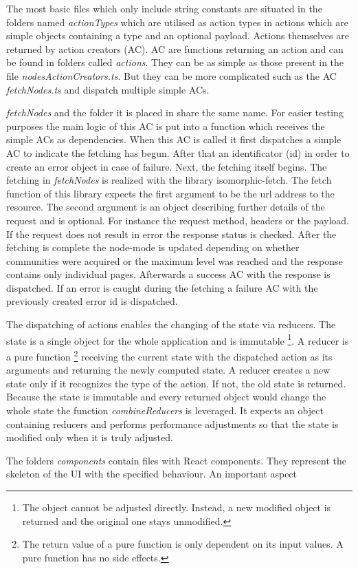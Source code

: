 The most basic files which only include string constants are situated in the folders named \textit{actionTypes} which are utilised as action types in actions which are simple objects containing a type and an optional payload. Actions themselves are returned by action creators (AC). AC are functions returning an action and can be found in folders called \textit{actions}. They can be as simple as those present in the file \textit{nodesActionCreators.ts}. But they can be more complicated such as the AC \textit{fetchNodes.ts} and dispatch multiple simple ACs. 

\textit{fetchNodes} and the folder it is placed in share the same name. For easier testing purposes the main logic of this AC is put into a function which receives the simple ACs as dependencies. When this AC is called it first dispatches a simple AC to indicate the fetching has begun. After that an identificator (id) in order to create an error object in case of failure. Next, the fetching itself begins. The fetching in \textit{fetchNodes} is realized with the library isomorphic-fetch. The fetch function of this library expects the first argument to be the url address to the resource. The second argument is an object describing further details of the request and is optional. For instance the request method, headers or the payload. If the request does not result in error the response status is checked. After the fetching is complete the node-mode is updated depending on whether communities were acquired or the maximum level was reached and the response contains only individual pages. Afterwards a success AC with the response is dispatched. If an error is caught during the fetching a failure AC with the previously created error id is dispatched.

The dispatching of actions enables the changing of the state via reducers. The state is a single object for the whole application and is immutable \footnote{The object cannot be adjusted directly. Instead, a new modified object is returned and the original one stays unmodified.}. A reducer is a pure function \footnote{The return value of a pure function is only dependent on its input values. A pure function has no side effects.} receiving the current state with the dispatched action as its arguments and returning the newly computed state. A reducer creates a new state only if it recognizes the type of the action. If not, the old state is returned. Because the state is immutable and every returned object would change the whole state the function \textit{combineReducers} is leveraged. It expects an object containing reducers and performs performance adjustments so that the state is modified only when it is truly adjusted.

The folders \textit{components} contain files with React components. They represent the skeleton of the UI with the specified behaviour. An important aspect 

